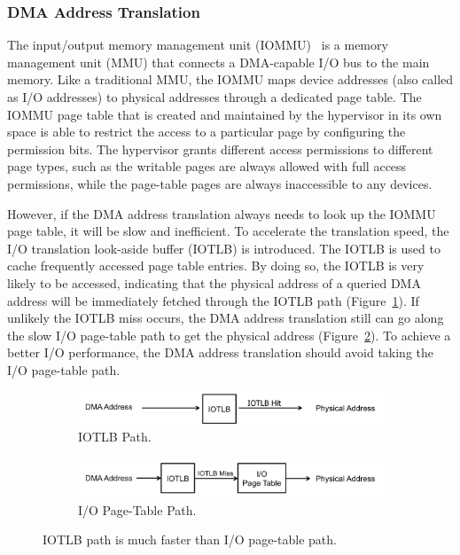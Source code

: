 \subsubsection{DMA Address Translation}
The input/output memory management unit (IOMMU)~\cite{intelvt} is a memory management unit (MMU) that connects a DMA-capable I/O bus to the main memory.
Like a traditional MMU, the IOMMU maps device addresses (also called as I/O addresses) to physical addresses through a dedicated page table.
The IOMMU page table that is created and maintained by the hypervisor in its own space is able to restrict the access to a particular page by configuring the permission bits.
The hypervisor grants different access permissions to different page types, such as the writable pages are always allowed with full access permissions, while the page-table pages are always inaccessible to any devices.

However, if the DMA address translation always needs to look up the IOMMU page table, it will be slow and inefficient.
To accelerate the translation speed, the I/O translation look-aside buffer (IOTLB) is introduced.
The IOTLB is used to cache frequently accessed page table entries.
By doing so, the IOTLB is very likely to be accessed, indicating that the physical address of a queried DMA address will be immediately fetched through the IOTLB path (Figure~\ref{fig:iotlbpath}).
If unlikely the IOTLB miss occurs, the DMA address translation still can go along the slow I/O page-table path to get the physical address (Figure~\ref{fig:ioptpath}).
To achieve a better I/O performance, the DMA address translation should avoid taking the I/O page-table path.

\begin{figure}[!t]
    \begin{subfigure}{0.45\textwidth}
        \includegraphics[width=1\textwidth]{image/background/DMA-IOTLB-translation.png}
        \caption{\centering IOTLB Path.}
        \label{fig:iotlbpath}
    \end{subfigure}
    \vfill
    \begin{subfigure}{0.45\textwidth}
        \includegraphics[width=1\textwidth]{image/background/DMA-pt-translation.png}
        \caption{\centering I/O Page-Table Path.}
        \label{fig:ioptpath}
    \end{subfigure}
    \caption{IOTLB path is much faster than I/O page-table path.}
    \label{fig:dma-add-trans}
\end{figure}


